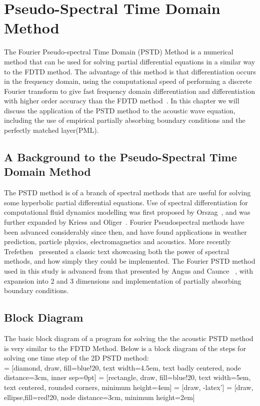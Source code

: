 
\section{Pseudo-Spectral Time Domain Method}
The Fourier Pseudo-spectral Time Domain (PSTD) Method is a numerical method that can be used for solving partial differential equations in a similar way to the FDTD method. The advantage of this method is that differentiation occurs in the frequency domain, using the computational speed of performing a discrete Fourier transform to give fast frequency domain differentiation and differentiation with higher order accuracy than the FDTD method~\cite{Hornikx2016}. In this chapter we will discuss the application of the PSTD method to the acoustic wave equation, including the use of empirical partially absorbing boundary conditions and the perfectly matched layer(PML).

\subsection{A Background to the Pseudo-Spectral Time Domain Method}
The PSTD method is of a branch of spectral methods that are useful for solving some hyperbolic partial differential equations. Use of spectral differentiation for computational fluid dynamics modelling was first proposed by Orszag~\cite{Orszag1971}, and was further expanded by Kriess and Oliger~\cite{Kreiss1972}. Fourier Pseudospectral methods have been advanced considerably since then, and have found applications in weather prediction, particle physics, electromagnetics and acoustics. More recently Trefethen~\cite{Trefethen2000} presented a classic text showcasing both the power of spectral methods, and how simply they could be implemented. The Fourier PSTD method used in this study is advanced from that presented by Angus and Caunce ~\cite{Angus2010}, with expansion into 2 and 3 dimensions and implementation of partially absorbing boundary conditions. 

\subsection{Block Diagram}
The basic block diagram of a program for solving the the acoustic PSTD method is very similar to the FDTD Method. Below is a block diagram of the steps for solving one time step of the 2D PSTD method:\\

 = [diamond, draw, fill=blue!20, 
    text width=4.5em, text badly centered, node distance=3cm, inner sep=0pt]
 = [rectangle, draw, fill=blue!20, 
    text width=5em, text centered, rounded corners, minimum height=4em]
 = [draw, -latex']
 = [draw, ellipse,fill=red!20, node distance=3cm,
    minimum height=2em]
    
